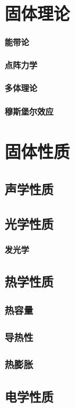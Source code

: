 \documentclass[UTF8]{../06-Physics}
\begin{document}
\chapter{固体理论}
    \subsubsection{能带论}
    \subsubsection{点阵力学}
    \subsubsection{多体理论}
    \subsubsection{穆斯堡尔效应}


\chapter{固体性质}

\section{声学性质}
\section{光学性质}
    \subsubsection{发光学}

\section{热学性质}
    \subsection{热容量}
    \subsection{导热性}
    \subsection{热膨胀}

\section{电学性质}
\end{document}

